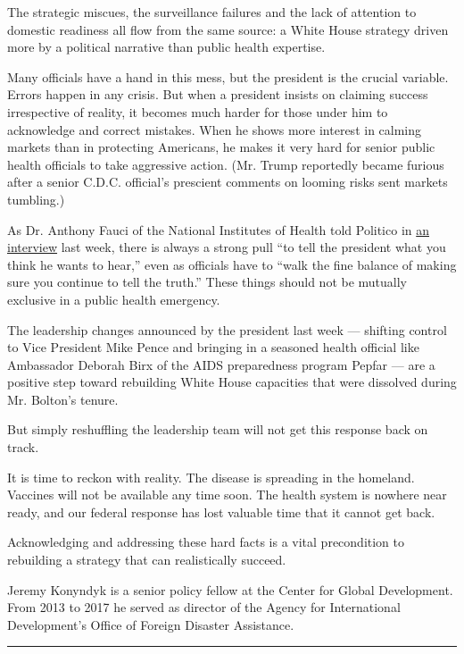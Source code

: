 The strategic miscues, the surveillance failures and the lack of
attention to domestic readiness all flow from the same source: a White
House strategy driven more by a political narrative than public health
expertise.

Many officials have a hand in this mess, but the president is the
crucial variable. Errors happen in any crisis. But when a president
insists on claiming success irrespective of reality, it becomes much
harder for those under him to acknowledge and correct mistakes. When he
shows more interest in calming markets than in protecting Americans, he
makes it very hard for senior public health officials to take aggressive
action. (Mr. Trump reportedly became furious after a senior C.D.C.
official's prescient comments on looming risks sent markets tumbling.)

As Dr. Anthony Fauci of the National Institutes of Health told Politico
in
\href{https://www.politico.com/news/2020/03/03/anthony-fauci-trump-coronavirus-crisis-118961}{an
interview} last week, there is always a strong pull ``to tell the
president what you think he wants to hear,'' even as officials have to
``walk the fine balance of making sure you continue to tell the truth.''
These things should not be mutually exclusive in a public health
emergency.

The leadership changes announced by the president last week --- shifting
control to Vice President Mike Pence and bringing in a seasoned health
official like Ambassador Deborah Birx of the AIDS preparedness program
Pepfar --- are a positive step toward rebuilding White House capacities
that were dissolved during Mr. Bolton's tenure.

But simply reshuffling the leadership team will not get this response
back on track.

It is time to reckon with reality. The disease is spreading in the
homeland. Vaccines will not be available any time soon. The health
system is nowhere near ready, and our federal response has lost valuable
time that it cannot get back.

Acknowledging and addressing these hard facts is a vital precondition to
rebuilding a strategy that can realistically succeed.

Jeremy Konyndyk is a senior policy fellow at the Center for Global
Development. From 2013 to 2017 he served as director of the Agency for
International Development's Office of Foreign Disaster Assistance.

\begin{center}\rule{0.5\linewidth}{\linethickness}\end{center}

